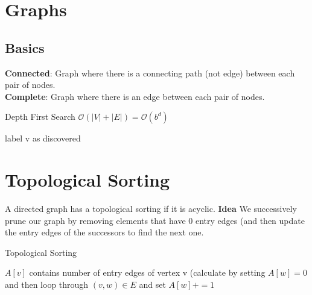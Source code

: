 \documentclass[9pt,landscape,a4paper, table]{extarticle}
\begin{document}
\begin{multicols*}{3}



\section{Graphs}

\subsection{Basics}

\textbf{Connected}: Graph where there is a connecting path (not edge) between each pair of nodes.\\
\textbf{Complete}: Graph where there is an edge between each pair of nodes. 



{\scriptsize
\begin{algorithm}[H]
    \caption{Depth First Search $\mathcal{O}(|V| + |E|)= \mathcal{O}(b^d)$}
    
    \SetAlgoLined
    label v as discovered\\

\end{algorithm}}

\section{Topological Sorting} {
A directed graph has a topological sorting if it is acyclic. \textbf{Idea} We successively prune our graph by removing elements that have 0 entry edges (and then update the entry edges of the successors to find the next one.

{\scriptsize
\begin{algorithm}[H]
    \caption{Topological Sorting}
    
    \SetAlgoLined

$A[v]$ contains number of entry edges of vertex v (calculate by setting $A[w] = 0$ and then loop through $(v, w) \in E$ and set $A[w] += 1$ 


\end{algorithm}}}
\end{multicols*}
\end{document}
